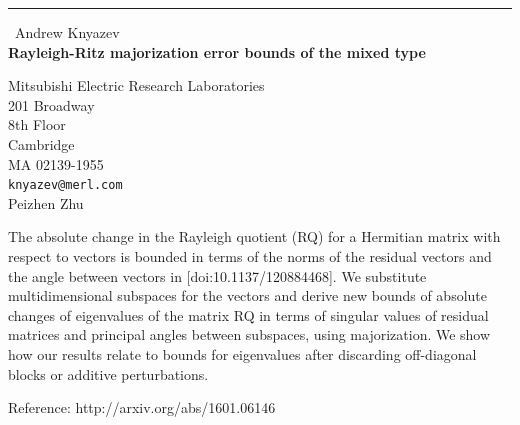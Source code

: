 \documentclass{report}
\begin{document}
\begin{center}
\rule{6in}{1pt} \
{\large Andrew Knyazev \\
{\bf Rayleigh-Ritz majorization error bounds of the mixed type }}

Mitsubishi Electric Research Laboratories \\ 201 Broadway \\ 8th Floor \\ Cambridge \\ MA 02139-1955
\\
{\tt knyazev@merl.com}\\
Peizhen Zhu\end{center}

The absolute change in the Rayleigh quotient (RQ) for a Hermitian matrix
with respect to vectors is bounded in terms of the norms of the residual
vectors and the angle between vectors in [doi:{10.1137/120884468}]. We
substitute multidimensional subspaces for the vectors and derive new
bounds of absolute changes of eigenvalues of the matrix RQ in terms of
singular values of residual matrices and principal angles between
subspaces, using majorization. We show how our results relate to bounds
for eigenvalues after discarding off-diagonal blocks or additive
perturbations.

Reference: http://arxiv.org/abs/1601.06146
\end{document}
